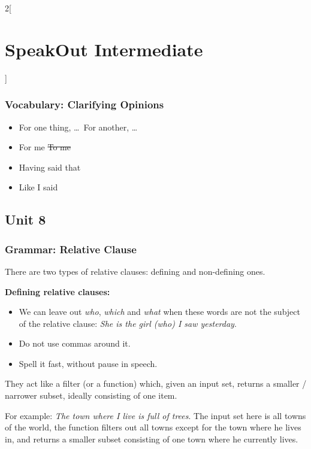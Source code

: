 \documentclass[10pt,a4paper]{article}
\newlength{\OriginalParIndent}
\newenvironment{ItemizeWithOrigParIndent}
    {\begin{itemize}[leftmargin=\OriginalParIndent]}
    {\end{itemize}}
\begin{document}
\begin{multicols}{2}[\section{SpeakOut Intermediate}]
\subsubsection{Vocabulary: Clarifying Opinions}
\begin{ItemizeWithOrigParIndent}
    \item For one thing, \dots\ For another, \dots
    \item For me \sout{To me}
    \item Having said that
    \item Like I said
\end{ItemizeWithOrigParIndent}





\subsection{Unit 8}
\subsubsection{Grammar: Relative Clause}
There are two types of relative clauses: defining and non-defining ones.

\textbf{Defining relative clauses:}
\begin{ItemizeWithOrigParIndent}
   \item We can leave out \textit{who}, \textit{which} and \textit{what} when these words are
   not the subject of the relative clause: \textit{She is the girl (who) I saw yesterday}.
   \item Do not use commas around it.
   \item Spell it fast, without pause in speech.
\end{ItemizeWithOrigParIndent}

They act like a filter (or a function) which, given an input set, returns a smaller / narrower subset,
ideally consisting of one item.

For example: \textit{The town where I live is full of trees}. The input set here is all towns
of the world, the function filters out all towns except for the town where he lives in,
and returns a smaller subset consisting of one town where he currently lives.


\end{multicols}
\end{document}

